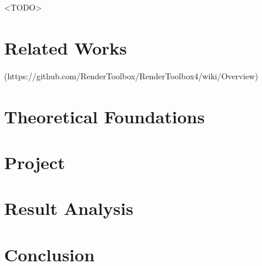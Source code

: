 \documentclass[cic,tc,english]{iiufrgs}
\begin{document}
<TODO>

\chapter{Related Works}


(https://github.com/RenderToolbox/RenderToolbox4/wiki/Overview)

\chapter{Theoretical Foundations}
\chapter{Project}
\chapter{Result Analysis}
\chapter{Conclusion}




\end{document}
